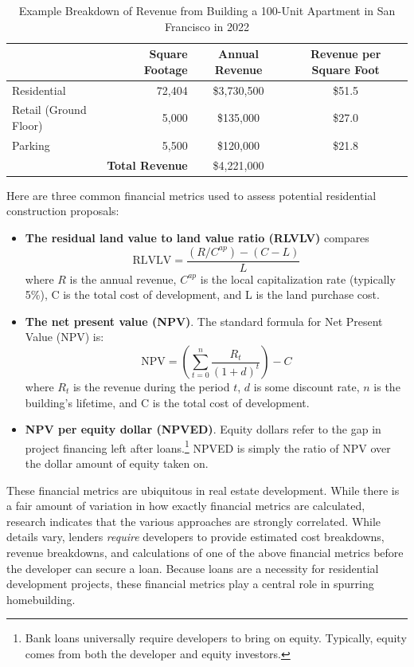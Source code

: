 \documentclass[a4paper,12pt]{article}
\begin{document}
\begin{table}[htb]
\centering
\caption{Example Breakdown of Revenue from Building a 100-Unit Apartment in San Francisco in 2022}
\label{tab:revenue.pro.forma}
\begin{tabular}{|l|r|c|c|}
\hline
  & \textbf{Square Footage} & \textbf{Annual Revenue} & \textbf{Revenue per Square Foot}\\
\hline
Residential &  72,404  & \$3,730,500 &  \$51.5  \\
\hline
Retail (Ground Floor) &  5,000 & \$135,000 & \$27.0 \\
\hline
Parking &  5,500  & \$120,000 & \$21.8 \\
\hline
\multicolumn{2}{|r|}{\textbf{Total Revenue}} & \$4,221,000 & \\
\hline
\end{tabular}
\end{table}


Here are three common financial metrics used to assess potential residential construction proposals:

\begin{itemize}
    \item \textbf{The residual land value to land value ratio (RLVLV)} compares 
    \[
\text{RLVLV} = \frac{(R/C^{ap}) - (C - L)}{L}
\]
where \( R \) is the annual revenue, $C^{ap}$ is the local capitalization rate (typically 5\%), C is the total cost of development, and L is the land purchase cost.
    
    \item \textbf{The net present value (NPV)}. The standard formula for Net Present Value (NPV) is:
\[
\text{NPV} = (\sum_{t=0}^{n} \frac{R_t}{(1+d)^t}) - C
\]
where \( R_t \) is the revenue during the period \( t \), \( d \) is some discount rate, \( n \) is the building's lifetime, and C is the total cost of development.

    \item \textbf{NPV per equity dollar (NPVED)}. Equity dollars refer to the gap in project financing left after loans.\cite{garcia2019making}\footnote{Bank loans universally require developers to bring on equity. Typically, equity comes from both the developer and equity investors.}  NPVED is simply the ratio of NPV over the dollar amount of equity taken on.
\end{itemize}

These financial metrics are ubiquitous in real estate development.\cite{murphy2020performing} While there is a fair amount of variation in how exactly financial metrics are calculated, research indicates that the various approaches are strongly correlated.\cite{byrne2011precisely} While details vary, lenders \textit{require} developers to provide estimated cost breakdowns, revenue breakdowns, and calculations of one of the above financial metrics before the developer can secure a loan.\cite{garcia2019making}\cite{murphy2020performing} Because loans are a necessity for residential development projects, these financial metrics play a central role in spurring homebuilding.
\end{document}
